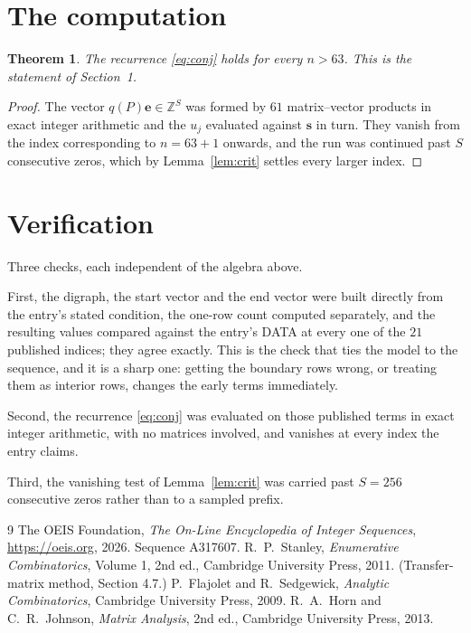 \documentclass[11pt,a4paper]{article}
\theoremstyle{plain}
\newtheorem{theorem}{Theorem}
\theoremstyle{definition}
\begin{document}
\section{The computation}

\begin{theorem}
The recurrence \eqref{eq:conj} holds for every $n>63$. This is the statement of
Section~1.
\end{theorem}

\begin{proof}
The vector $q(P)\mathbf{e}\in\mathbb{Z}^{S}$ was formed by $61$ matrix--vector
products in exact integer arithmetic and the $u_j$ evaluated against $\mathbf{s}$ in turn.
They vanish from the index corresponding to $n=63+1$ onwards, and the run was continued
past $S$ consecutive zeros, which by Lemma~\ref{lem:crit} settles every larger index.
\end{proof}

\section{Verification}

Three checks, each independent of the algebra above.

First, the digraph, the start vector and the end vector were built directly from the
entry's stated condition, the one-row count computed separately, and the resulting values
compared against the entry's DATA at every one of the $21$ published indices; they
agree exactly. This is the check that ties the model to the sequence, and it is a sharp one:
getting the boundary rows wrong, or treating them as interior rows, changes the early terms
immediately.

Second, the recurrence \eqref{eq:conj} was evaluated on those published terms in exact
integer arithmetic, with no matrices involved, and vanishes at every index the entry claims.

Third, the vanishing test of Lemma~\ref{lem:crit} was carried past $S=256$ consecutive
zeros rather than to a sampled prefix.

\begin{thebibliography}{9}
 The OEIS Foundation, \emph{The On-Line Encyclopedia of Integer
Sequences}, \url{https://oeis.org}, 2026. Sequence A317607.
 R.~P.~Stanley, \emph{Enumerative Combinatorics}, Volume 1, 2nd ed.,
Cambridge University Press, 2011. (Transfer-matrix method, Section 4.7.)
 P.~Flajolet and R.~Sedgewick, \emph{Analytic Combinatorics}, Cambridge
University Press, 2009.
 R.~A.~Horn and C.~R.~Johnson, \emph{Matrix Analysis}, 2nd ed., Cambridge
University Press, 2013.
\end{thebibliography}
\end{document}
